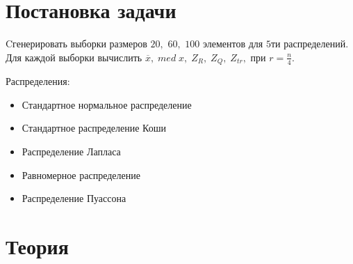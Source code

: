 \documentclass[a4]{article}
\begin{document}
\newpage
\pagestyle{plain}




\newpage
\tableofcontents{}
\newpage

\section{Постановка задачи}

Cгенерировать выборки размеров $20,$ $60,$ $100$ элементов для $5$ти распределений. Для каждой выборки вычислить $\overline{x},\; med\; x,\; Z_R,\; Z_Q,\; Z_{tr},$ при $r = \frac{n}{4}.$

Распределения:
\begin{itemize}
\item Стандартное нормальное распределение
\item Стандартное распределение Коши
\item Распределение Лапласа 
\item Равномерное распределение 
\item Распределение Пуассона 
\end{itemize}



\section{Теория}
\end{document}
